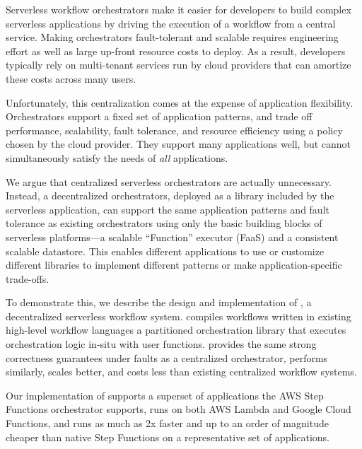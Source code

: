 Serverless workflow orchestrators make it easier for developers to build complex
serverless applications by driving the execution of a workflow from a central
service.  Making orchestrators fault-tolerant and scalable requires engineering
effort as well as large up-front resource costs to deploy. As a result,
developers typically rely on multi-tenant services run by cloud providers that
can amortize these costs across many users.

Unfortunately, this centralization comes at the expense of application
flexibility. Orchestrators support a fixed set of application patterns, and
trade off performance, scalability, fault tolerance, and resource efficiency
using a policy chosen by the cloud provider. They support many applications
well, but cannot simultaneously satisfy the needs of \emph{all} applications.

We argue that centralized serverless orchestrators are actually unnecessary.
Instead, a decentralized orchestrators, deployed as a library included by the
serverless application, can support the same application patterns and fault
tolerance as existing orchestrators using only the basic building blocks of
serverless platforms---a scalable ``Function'' executor (FaaS) and a consistent
scalable datastore. This enables different applications to use or customize
different libraries to implement different patterns or make application-specific
trade-offs.

To demonstrate this, we describe the design and implementation of \name{}, a
decentralized serverless workflow system. \name{} compiles workflows written in
existing high-level workflow languages a partitioned orchestration library that
executes orchestration logic in-situ with user functions. \name{} provides the same
strong correctness guarantees under faults as a centralized orchestrator, performs
similarly, scales better, and costs less than existing centralized workflow
systems.

Our implementation of \name{} supports a superset of applications the AWS Step
Functions orchestrator supports, runs on both AWS Lambda and Google Cloud
Functions, and runs as much as 2x faster and up to an order of magnitude cheaper
than native Step Functions on a representative set of applications.
